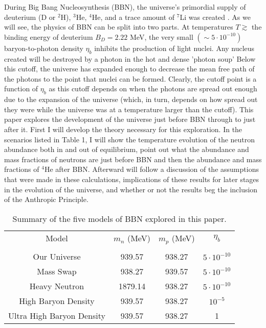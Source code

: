 \documentclass[aps,reprint,prl]{revtex4-1}
\begin{document}
 During Big Bang Nucleosynthesis (BBN), the universe's primordial supply of deuterium (D or $^2$H), $^3$He, $^4$He, and a trace amount of $^7$Li was created \cite{wiki:BBN}.  As we will see, the physics of BBN can be split into two parts.  At temperatures $T\gtrsim$ the binding energy of deuterium $B_D=2.22$ MeV,  the very small $\left(\sim5\cdot 10^{-10}\right)$ baryon-to-photon density $\eta_b$ inhibits the production of light nuclei.  Any nucleus created will be destroyed by a photon in the hot and dense 'photon soup'  Below this cutoff, the universe has expanded enough to decrease the mean free path of the photons to the point that nuclei can be formed.  Clearly, the cutoff point is a function of $\eta_b$ as this cutoff depends on when the photons are spread out enough due to the expansion of the universe (which, in turn, depends on how spread out they were while the universe was at a temperature larger than the cutoff).  This paper explores the development of the universe just before BBN through to just after it.  First I will develop the theory necessary for this exploration.  In the scenarios listed in Table 1, I will show the temperature evolution of the neutron abundance both in and out of equilibrium, point out what the abundance and mass fractions of neutrons are just before BBN and then the abundance and mass fractions of $^4$He after BBN.  Afterward will follow a discussion of the assumptions that were made in these calculations, implications of these results for later stages in the evolution of the universe, and whether or not the results beg the inclusion of the Anthropic Principle.
\begin{table}[h]
\begin{tabular}{c|c|c|c}
Model                     & $m_n$ (MeV) & $m_p$ (MeV) & $\eta_b$         \\
                          &             &             &                  \\ \hline
Our Universe              & 939.57      & 938.27      & $5\cdot10^{-10}$ \\ \hline
Mass Swap                 & 938.27      & 939.57      & $5\cdot10^{-10}$ \\ \hline
Heavy Neutron             & 1879.14     & 938.27      & $5\cdot10^{-10}$ \\ \hline
High Baryon Density       & 939.57      & 938.27      & $10^{-5}$        \\ \hline
Ultra High Baryon Density & 939.57      & 938.27      & 1               
\end{tabular}
\caption{Summary of the five models of BBN explored in this paper.}
\end{table}
\end{document}
